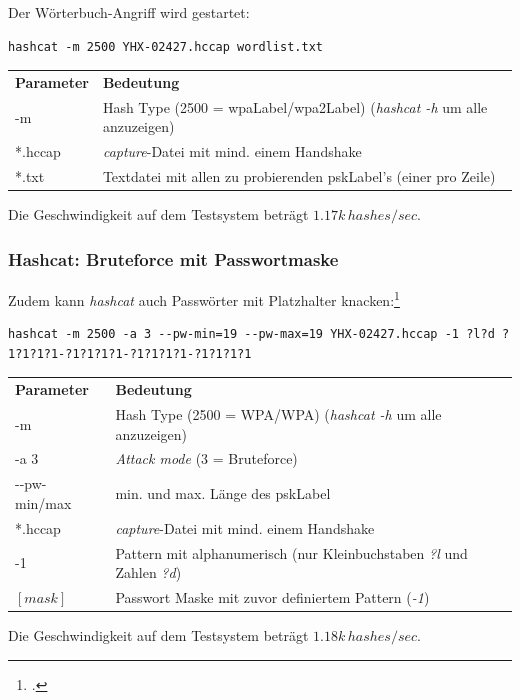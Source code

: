 Der Wörterbuch-Angriff wird gestartet:
\begin{lstlisting}[style=lstStyleFramed]
hashcat -m 2500 YHX-02427.hccap wordlist.txt
\end{lstlisting}
\begin{tabular}{l l}
	\textbf{Parameter} & \textbf{Bedeutung}\\
	-m & Hash Type (2500 = \gls{wpaLabel}/\gls{wpa2Label}) (\textit{hashcat -h} um alle anzuzeigen)\\
	*.hccap & \textit{capture}-Datei mit mind. einem Handshake\\
	*.txt & Textdatei mit allen zu probierenden \gls{pskLabel}'s (einer pro Zeile)\\
\end{tabular}

Die Geschwindigkeit auf dem Testsystem beträgt $1.17k\,hashes/sec$.

\subsubsection{Hashcat: Bruteforce mit Passwortmaske}
Zudem kann \textit{hashcat} auch Passwörter mit Platzhalter knacken:\footcite{mask_attack_hashcat_wiki_2015-04-13}
\begin{lstlisting}[style=lstStyleFramed]
hashcat -m 2500 -a 3 --pw-min=19 --pw-max=19 YHX-02427.hccap -1 ?l?d ?1?1?1?1-?1?1?1?1-?1?1?1?1-?1?1?1?1
\end{lstlisting}
\begin{tabular}{l l}
	\textbf{Parameter} & \textbf{Bedeutung}\\
	-m & Hash Type (2500 = WPA/WPA) (\textit{hashcat -h} um alle anzuzeigen)\\
	-a 3 & \textit{Attack mode} (3 = Bruteforce)\\
	-{}-pw-min/max & min. und max. Länge des \gls{pskLabel}\\
	*.hccap & \textit{capture}-Datei mit mind. einem Handshake\\
	-1 & Pattern mit alphanumerisch (nur Kleinbuchstaben \textit{?l} und Zahlen \textit{?d})\\
	$[mask]$ & Passwort Maske mit zuvor definiertem Pattern (\textit{-1})\\
\end{tabular}

Die Geschwindigkeit auf dem Testsystem beträgt $1.18k\,hashes/sec$.

